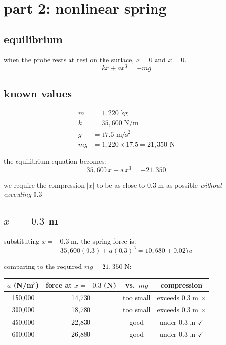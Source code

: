 \documentclass[12pt]{article}
\begin{document}
\section{part 2: nonlinear spring}

\subsection{equilibrium}

when the probe rests at rest on the surface, $\dot{x} = 0$ and $\ddot{x} = 0$.
\[
    kx + ax^3 = -mg
\]

\subsection{known values}

\begin{align*}
    m &= 1{,}220 \text{ kg} \\
    k &= 35{,}600 \text{ N/m} \\
    g &= 17.5 \text{ m/s}^2 \\
    mg &= 1{,}220 \times 17.5 = 21{,}350 \text{ N}
\end{align*}

the equilibrium equation becomes:
\[
    35{,}600\, x + a\, x^3 = -21{,}350
\]

we require the compression $|x|$ to be as close to $0.3$ m as possible \textit{without exceeding} $0.3$ 

\subsection{$x = -0.3$ m}

substituting $x = -0.3$ m, the spring force is:
\[
    35{,}600(0.3) + a(0.3)^3 = 10{,}680 + 0.027a
\]

comparing to the required $mg = 21{,}350$ N:

\begin{center}
\begin{tabular}{cccc}
\toprule
$a$ (N/m$^3$) & force at $x=-0.3$ (N) & vs.\ $mg$ & compression \\
\midrule
150,000 & 14,730 & too small & exceeds 0.3 m $\times$ \\
300,000 & 18,780 & too small & exceeds 0.3 m $\times$ \\
450,000 & 22,830 & good & under 0.3 m $\checkmark$ \\
600,000 & 26,880 & good & under 0.3 m $\checkmark$ \\
\bottomrule
\end{tabular}
\end{center}
\end{document}
